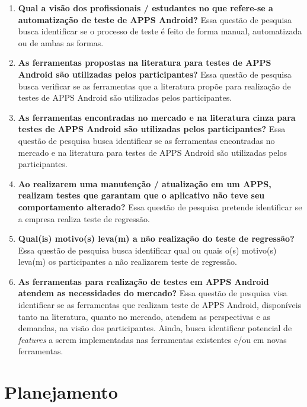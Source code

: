 \begin{enumerate}[label=\bf QP\arabic*,leftmargin=1.8cm]
    
    \item \textbf{Qual a visão dos profissionais / estudantes no que refere-se a automatização de teste de \ac{APPS} Android?} Essa questão de pesquisa busca identificar se o processo de teste é feito de forma manual, automatizada ou de ambas as formas.
    
    \item \textbf{As ferramentas propostas na literatura para testes de \ac{APPS} Android são utilizadas pelos participantes?} Essa questão de pesquisa busca verificar se as ferramentas que a literatura propõe para realização de testes de \ac{APPS} Android são utilizadas pelos participantes.
    
    \item \textbf{As ferramentas encontradas no mercado e na literatura cinza para testes de \ac{APPS} Android são utilizadas pelos participantes?} Essa questão de pesquisa busca identificar se as ferramentas encontradas no mercado e na literatura para testes de \ac{APPS} Android são utilizadas pelos participantes.
    
    \item \textbf{Ao realizarem uma manutenção / atualização em um \ac{APPS}, realizam testes que garantam que o aplicativo não teve seu comportamento alterado?} Essa questão de pesquisa pretende identificar se a empresa realiza teste de regressão.
    
    \item \textbf{Qual(is) motivo(s) leva(m) a não realização do teste de regressão?} Essa questão de pesquisa busca identificar qual ou quais o(s) motivo(s) leva(m) os participantes a não realizarem teste de regressão.
    
    \item \textbf{As ferramentas para realização de testes em \ac{APPS} Android atendem as necessidades do mercado?} Essa questão de pesquisa visa identificar se as ferramentas que realizam teste de \ac{APPS} Android, disponíveis tanto na literatura, quanto no mercado, atendem as perspectivas e as demandas, na visão dos participantes. Ainda, busca identificar potencial de \textit{features} a serem implementadas nas ferramentas existentes e/ou em novas ferramentas.
    
\end{enumerate}


\section{Planejamento}

